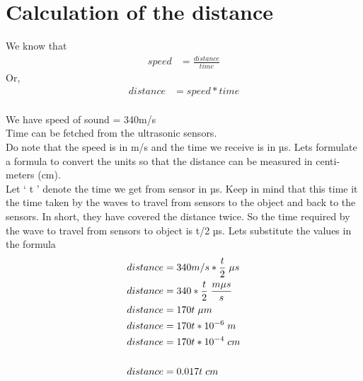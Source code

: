 \section{Calculation of the distance}
We know that 
\begin{align*}
    speed &= \frac{distance}{time}
\end{align*}
Or,
\begin{align*}
    distance &= speed * time
\end{align*}  
\\ We have 
    speed of sound = 340m/s
\\Time can be fetched from the ultrasonic sensors.
\\Do note that the speed is in m/s and the time we receive is in µs. Lets formulate a formula to convert the units so that the distance can be measured in centi-meters (cm).
\\Let ‘ t ’ denote the time we get from sensor in µs. Keep in mind that this time it the time taken by the waves to travel from sensors to the object and back to the sensors. In short, they have covered the distance twice. So the time required by the wave to travel from sensors to object is t/2 µs. Lets substitute the values in the formula
\begin{align*}
    distance &= 340 m/s * \frac{t}{2} \hspace{0.1cm} \mu s \\
    distance &= 340 * \frac{t}{2} \hspace{0.1cm} \frac{m \mu s}{s} \\
    distance &= 170t\hspace{0.1cm} \mu m \\
    distance &= 170t * 10^{-6} \hspace{0.1cm} m \\
    distance &= 170t * 10^{-4} \hspace{0.1cm} cm \\
    \vspace{0.3cm} \\
    distance &= 0.017t \hspace{0.1cm} cm \\
\end{align*}


